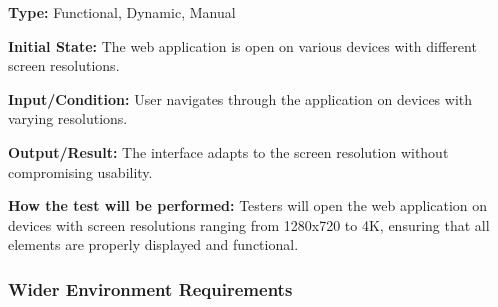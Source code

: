 \documentclass[12pt, titlepage]{article}
\begin{document}
\begin{enumerate}
\textbf{Type:} Functional, Dynamic, Manual

\textbf{Initial State:} The web application is open on various devices with different screen resolutions.

\textbf{Input/Condition:} User navigates through the application on devices with varying resolutions.

\textbf{Output/Result:} The interface adapts to the screen resolution without compromising usability.

\textbf{How the test will be performed:} Testers will open the web application on devices with screen resolutions ranging from 1280x720 to 4K, ensuring that all elements are properly displayed and functional.

\end{enumerate}

\subsubsection{Wider Environment Requirements}
\end{document}
